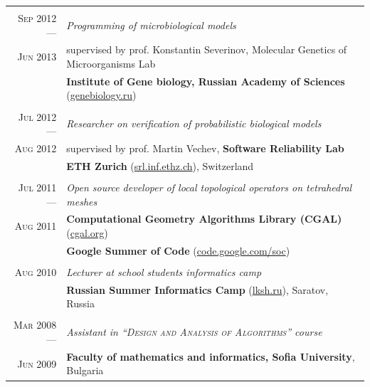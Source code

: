 \documentclass[a4paper,10pt]{article}
\def\myline{\color{linegray}\vline}
\begin{document}
{\begin{tabular}{r!{\myline}p{14cm}}
        \\
	\textsc{Sep 2012 ---}      &  \textit{Programming of microbiological models}\\
        \textsc{Jun 2013}  &  supervised by prof. Konstantin Severinov, Molecular Genetics of Microorganisms Lab\\
                                  &  \textbf{Institute of Gene biology, Russian Academy of Sciences} (\href{http://www.genebiology.ru/}{genebiology.ru})\\
	
        \\
	\textsc{Jul 2012 ---}      &  \textit{Researcher on verification of probabilistic biological models}\\
        \textsc{Aug 2012} &  supervised by prof. Martin Vechev, \textbf{Software Reliability Lab}\\
                                  &  \textbf{ETH Zurich} (\href{http://www.srl.inf.ethz.ch/}{srl.inf.ethz.ch}), Switzerland\\
	
        \\
	\textsc{Jul 2011 ---}      &  \textit{Open source developer of local topological operators on tetrahedral meshes}\\
	\textsc{Aug 2011}         &  \textbf{Computational Geometry Algorithms Library (CGAL)} (\href{http://www.cgal.org/}{cgal.org})\\
                                  &  \textbf{Google Summer of Code} (\href{http://code.google.com/soc/}{code.google.com/soc})\\
	
        \\
	\textsc{Aug 2010}         &  \textit{Lecturer at school students informatics camp}\\
	                          &  \textbf{Russian Summer Informatics Camp} (\href{http://lksh.ru/}{lksh.ru}), Saratov, Russia\vspace{-5mm}\\
	
	\\
	\textsc{Mar 2008 ---}      &  \textit{Assistant in \textsc{``Design and Analysis of Algorithms''} course}\\
	\textsc{Jun 2009}        &  \textbf{Faculty of mathematics and informatics, Sofia University}, Bulgaria\\


\end{tabular}}
\end{document}

